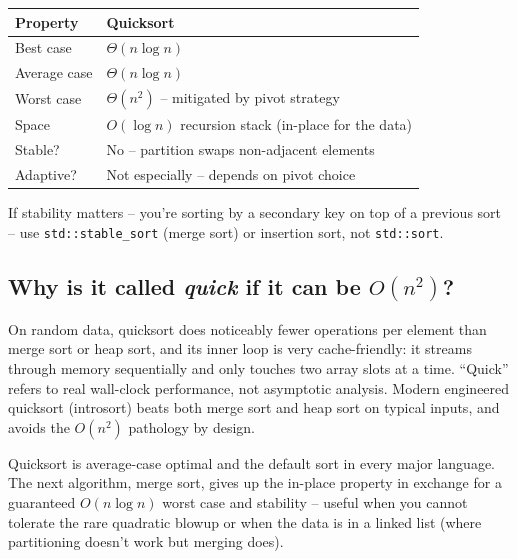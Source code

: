 \documentclass[11pt]{article}
\begin{document}
\begin{center}
\footnotesize
\renewcommand{\arraystretch}{1.3}
\begin{tabular}{@{}ll@{}}
\hline
\textbf{Property}   & \textbf{Quicksort} \\
\hline
Best case           & $\Theta(n \log n)$ \\
Average case        & $\Theta(n \log n)$ \\
Worst case          & $\Theta(n^2)$ -- mitigated by pivot strategy \\
Space               & $O(\log n)$ recursion stack (in-place for the data) \\
Stable?             & No -- partition swaps non-adjacent elements \\
Adaptive?           & Not especially -- depends on pivot choice \\
\hline
\end{tabular}
\end{center}

\begin{warnbox}
If stability matters -- you're sorting by a secondary key on top of
a previous sort -- use \texttt{std::stable\_sort} (merge sort) or
insertion sort, not \texttt{std::sort}.
\end{warnbox}

\subsection{Why is it called \emph{quick} if it can be $O(n^2)$?}

\begin{ideabox}
On random data, quicksort does noticeably fewer operations per
element than merge sort or heap sort, and its inner loop is very
cache-friendly: it streams through memory sequentially and only
touches two array slots at a time. ``Quick'' refers to real
wall-clock performance, not asymptotic analysis. Modern engineered
quicksort (introsort) beats both merge sort and heap sort on typical
inputs, and avoids the $O(n^2)$ pathology by design.
\end{ideabox}

\begin{notebox}
Quicksort is average-case optimal and the default sort in every
major language. The next algorithm, merge sort, gives up the
in-place property in exchange for a guaranteed $O(n \log n)$ worst
case and stability -- useful when you cannot tolerate the rare
quadratic blowup or when the data is in a linked list (where
partitioning doesn't work but merging does).
\end{notebox}
\end{document}
